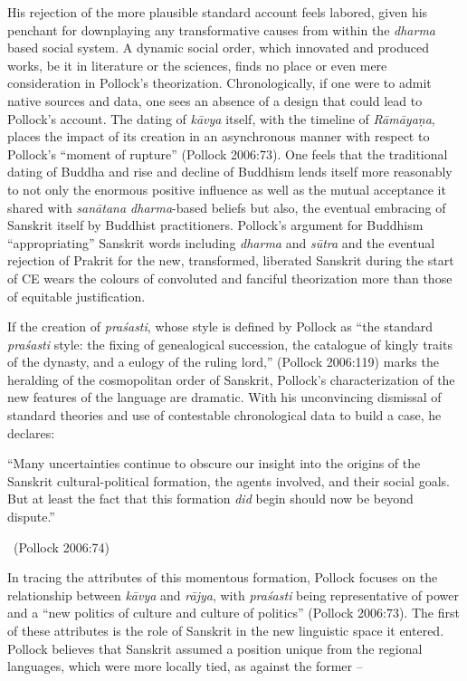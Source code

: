 His rejection of the more plausible standard account feels labored, given his penchant for downplaying any transformative causes from within the \textit{dharma} based social system. A dynamic social order, which innovated and produced works, be it in literature or the sciences, finds no place or even mere consideration in Pollock’s theorization. Chronologically, if one were to admit native sources and data, one sees an absence of a design that could lead to Pollock’s account. The dating of \textit{kāvya} itself, with the timeline of \textit{Rāmāyaṇa}, places the impact of its creation in an asynchronous manner with respect to Pollock’s “moment of rupture” (Pollock 2006:73). One feels that the traditional dating of Buddha and rise and decline of Buddhism lends itself more reasonably to not only the enormous positive influence as well as the mutual acceptance it shared with \textit{sanātana dharma}-based beliefs but also, the eventual embracing of Sanskrit itself by Buddhist practitioners. Pollock’s argument for Buddhism “appropriating” Sanskrit words including \textit{dharma} and \textit{sūtra} and the eventual rejection of Prakrit for the new, transformed, liberated Sanskrit during the start of CE wears the colours of convoluted and fanciful theorization more than those of equitable justification.

If the creation of \textit{praśasti}, whose style is defined by Pollock as “the standard \textit{praśasti} style: the fixing of genealogical succession, the catalogue of kingly traits of the dynasty, and a eulogy of the ruling lord,” (Pollock 2006:119) marks the heralding of the cosmopolitan order of Sanskrit, Pollock’s characterization of the new features of the language are dramatic. With his unconvincing dismissal of standard theories and use of contestable chronological data to build a case, he declares:

\begin{myquote}
“Many uncertainties continue to obscure our insight into the origins of the Sanskrit cultural-political formation, the agents involved, and their social goals. But at least the fact that this formation \textit{did} begin should now be beyond dispute.” 

~\hfill (Pollock 2006:74)
\end{myquote}

In tracing the attributes of this momentous formation, Pollock focuses on the relationship between \textit{kāvya} and \textit{rājya}, with \textit{praśasti} being representative of power and a “new politics of culture and culture of politics” (Pollock 2006:73). The first of these attributes is the role of Sanskrit in the new linguistic space it entered. Pollock believes that Sanskrit assumed a position unique from the regional languages, which were more locally tied, as against the former –

